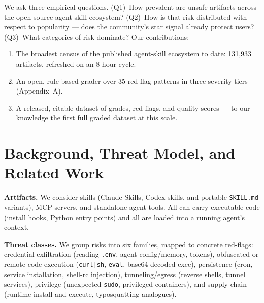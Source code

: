\documentclass[11pt]{article}
\begin{document}
We ask three empirical questions. (Q1)~How prevalent are unsafe artifacts
across the open-source agent-skill ecosystem? (Q2)~How is that risk
distributed with respect to popularity --- does the community's star signal
already protect users? (Q3)~What categories of risk dominate? Our
contributions:

\begin{enumerate}
  \item The broadest census of the published agent-skill ecosystem to date:
        131,933 artifacts, refreshed on an 8-hour cycle.
  \item An open, rule-based grader over 35 red-flag patterns in three
        severity tiers (Appendix~A).
  \item A released, citable dataset of grades, red-flags, and quality scores
        --- to our knowledge the first full graded dataset at this scale.
\end{enumerate}

\section{Background, Threat Model, and Related Work}

\textbf{Artifacts.} We consider skills (Claude Skills, Codex skills, and
portable \texttt{SKILL.md} variants), MCP servers, and standalone agent
tools. All can carry executable code (install hooks, Python entry points) and
all are loaded into a running agent's context.

\textbf{Threat classes.} We group risks into six families, mapped to concrete
red-flags: credential exfiltration (reading \texttt{.env}, agent
config/memory, tokens), obfuscated or remote code execution
(\texttt{curl|sh}, \texttt{eval}, base64-decoded exec), persistence (cron,
service installation, shell-rc injection), tunneling/egress (reverse shells,
tunnel services), privilege (unexpected \texttt{sudo}, privileged
containers), and supply-chain (runtime install-and-execute, typosquatting
analogues).
\end{document}
